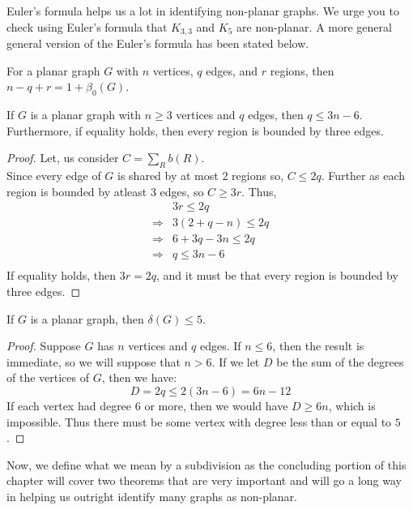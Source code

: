 Euler's formula helps us a lot in identifying non-planar graphs. We urge you to check using Euler's formula that $K_{3,3}$ and $K_5$ are non-planar. A more general general version of the Euler's formula has been stated below.

\begin{thm}
    For a planar graph $G$ with $n$ vertices, $q$ edges, and $r$ regions, then $n-q+r=1+\beta_{0}(G)$.
\end{thm}

\begin{thm}
    If $G$ is a planar graph with $n \ge 3$ vertices and $q$ edges, then $q \le 3n - 6$. Furthermore, if equality holds, then every region is bounded by three edges.
\end{thm}
\begin{proof}
    Let, us consider $C=\sum_{R}b(R)$.\\
    Since every edge of $G$ is shared by at most $2$ regions so, $C \le 2q$. Further as each region is bounded by atleast $3$ edges, so $C \ge 3r$. Thus,\\
    \begin{align*}
        &3r \le 2q\\
        \Longrightarrow &3(2+q-n) \le 2q\\
        \Longrightarrow &6+3q-3n \le 2q\\
        \Longrightarrow &q \le 3n-6\\
    \end{align*}
    If equality holds, then $3r = 2q$, and it must be that every region is bounded by three edges.
\end{proof}

\begin{thm}
    If $G$ is a planar graph, then $\delta(G) \le 5$.
\end{thm}
\begin{proof}
    Suppose $G$ has $n$ vertices and $q$ edges. If $n \le 6$, then the result is immediate, so we will suppose that $n > 6$. If we let $D$ be the sum of the degrees of the vertices of $G$, then we have:\\
    \begin{equation*}
        D = 2q \le 2(3n - 6) = 6n - 12
    \end{equation*}
    If each vertex had degree $6$ or more, then we would have $D \ge 6n$, which is impossible. Thus there must be some vertex with degree less than or equal to $5$.
\end{proof}

Now, we define what we mean by a subdivision as the concluding portion of this chapter will cover two theorems that are very important and will go a long way in helping us outright identify many graphs as non-planar.\\

